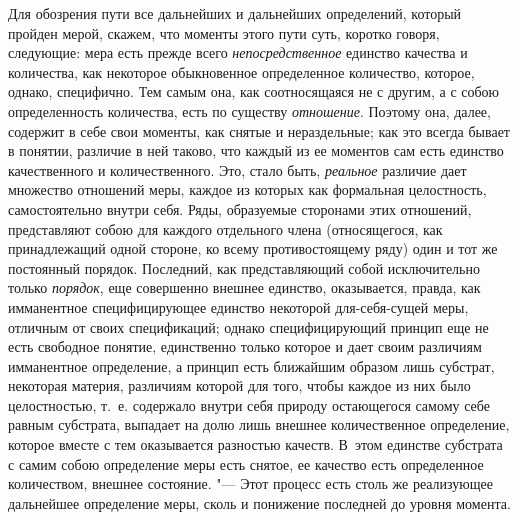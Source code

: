 Для обозрения пути все дальнейших и дальнейших определений, который пройден
мерой, скажем, что моменты этого пути суть, коротко говоря, следующие: мера
есть прежде всего {\em непосредственное} единство
качества и количества, как некоторое обыкновенное определенное количество,
которое, однако, специфично. Тем самым она, как соотносящаяся не с другим,
а с собою определенность количества, есть по существу
{\em отношение}. Поэтому она, далее, содержит в себе
свои моменты, как снятые и нераздельные; как это всегда бывает в понятии,
различие в ней таково, что каждый из ее моментов сам есть единство
качественного и количественного. Это, стало быть,
{\em реальное} различие дает множество отношений меры,
каждое из которых как формальная целостность, самостоятельно внутри себя.
Ряды, образуемые сторонами этих отношений, представляют собою для каждого
отдельного члена (относящегося, как принадлежащий одной стороне, ко всему
противостоящему ряду) один и тот же постоянный порядок. Последний, как
представляющий собой исключительно только
{\em порядок}, еще совершенно внешнее единство,
оказывается, правда, как имманентное специфицирующее единство некоторой
для-себя-сущей меры, отличным от своих спецификаций; однако специфицирующий
принцип еще не есть свободное понятие, единственно только которое и дает
своим различиям имманентное определение, а принцип есть ближайшим образом
лишь субстрат, некоторая материя, различиям которой для того, чтобы каждое
из них было целостностью, т.~е. содержало внутри себя природу остающегося
самому себе равным субстрата, выпадает на долю лишь внешнее количественное
определение, которое вместе с тем оказывается разностью качеств. В~этом
единстве субстрата с самим собою определение меры есть снятое, ее качество
есть определенное количеством, внешнее состояние. "--- Этот процесс есть столь
же реализующее дальнейшее определение меры, сколь и понижение последней до
уровня момента.

